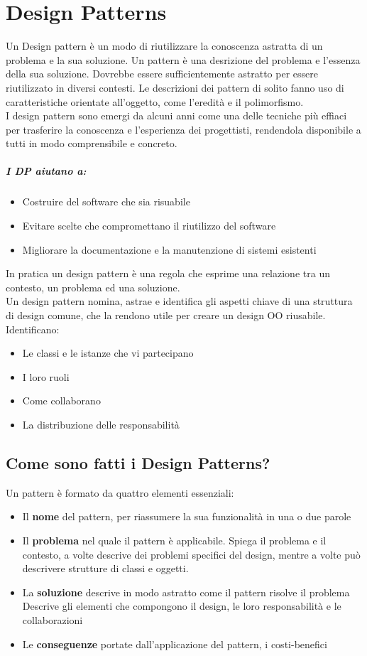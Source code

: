 \chapter{Design Patterns}
Un Design pattern è un modo di riutilizzare la conoscenza astratta di un problema e la
sua soluzione. Un pattern è una desrizione del problema e l'essenza della sua soluzione.
Dovrebbe essere sufficientemente astratto per essere riutilizzato in diversi contesti.
Le descrizioni dei pattern di solito fanno uso di caratteristiche orientate all'oggetto,
come l'eredità e il polimorfismo.\\
I design pattern sono emergi da alcuni anni come una delle tecniche più effiaci per
trasferire la conoscenza e l'esperienza dei progettisti, rendendola disponibile a tutti
in modo comprensibile e concreto.
\paragraph*{I DP aiutano a:}
\begin{itemize}
    \item Costruire del software che sia risuabile
    \item Evitare scelte che compromettano il riutilizzo del software
    \item Migliorare la documentazione e la manutenzione di sistemi esistenti
\end{itemize}
In pratica un design pattern è una regola che esprime una relazione tra un contesto,
un problema ed una soluzione.\\
Un design pattern nomina, astrae e identifica gli aspetti chiave di una struttura di
design comune, che la rendono utile per creare un design OO riusabile.\\
Identificano:
\begin{itemize}
    \item Le classi e le istanze che vi partecipano
    \item I loro ruoli
    \item Come collaborano
    \item La distribuzione delle responsabilità
\end{itemize}
\section{Come sono fatti i Design Patterns?}
Un pattern è formato da quattro elementi essenziali:
\begin{itemize}
    \item Il \textbf{nome} del pattern, per riassumere la sua funzionalità in una o due parole
    \item Il \textbf{problema} nel quale il pattern è applicabile. Spiega il problema e il contesto,
    a volte descrive dei problemi specifici del design, mentre a volte può descrivere strutture di
    classi e oggetti.
    \item La \textbf{soluzione} descrive in modo astratto come il pattern risolve il problema
    Descrive gli elementi che compongono il design, le loro responsabilità e le collaborazioni
    \item Le \textbf{conseguenze} portate dall'applicazione del pattern, i costi-benefici
\end{itemize}

